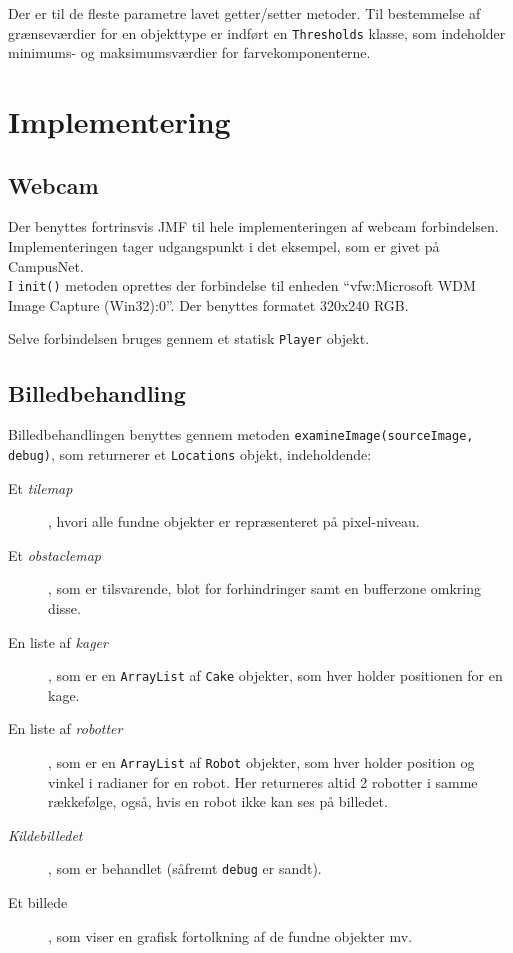 Der er til de fleste parametre lavet getter/setter metoder. Til bestemmelse af grænseværdier for en objekttype er indført en \texttt{Thresholds} klasse, som indeholder minimums- og maksimumsværdier for farvekomponenterne.

\section{Implementering}
\subsection{Webcam}
Der benyttes fortrinsvis JMF til hele implementeringen af webcam forbindelsen. Implementeringen tager udgangspunkt i det eksempel, som er givet på CampusNet. \\
I \texttt{init()} metoden oprettes der forbindelse til enheden "`vfw:Microsoft WDM Image Capture (Win32):0"'. Der benyttes formatet 320x240 RGB.

Selve forbindelsen bruges gennem et statisk \texttt{Player} objekt.

\subsection{Billedbehandling}
Billedbehandlingen benyttes gennem metoden \texttt{examineImage(sourceImage, debug)}, som returnerer et \texttt{Locations} objekt, indeholdende:
\begin{description}
	\item[Et \textit{tilemap}], hvori alle fundne objekter er repræsenteret på pixel-niveau.
	\item[Et \textit{obstaclemap}], som er tilsvarende, blot for forhindringer samt en bufferzone omkring disse.
	\item[En liste af \textit{kager}], som er en \texttt{ArrayList} af \texttt{Cake} objekter, som hver holder positionen for en kage.
	\item[En liste af \textit{robotter}], som er en \texttt{ArrayList} af \texttt{Robot} objekter, som hver holder position og vinkel i radianer for en robot. Her returneres altid 2 robotter i samme rækkefølge, også, hvis en robot ikke kan ses på billedet.
	\item[\textit{Kildebilledet}], som er behandlet (såfremt \texttt{debug} er sandt).
	\item[Et billede], som viser en grafisk fortolkning af de fundne objekter mv.
\end{description}

